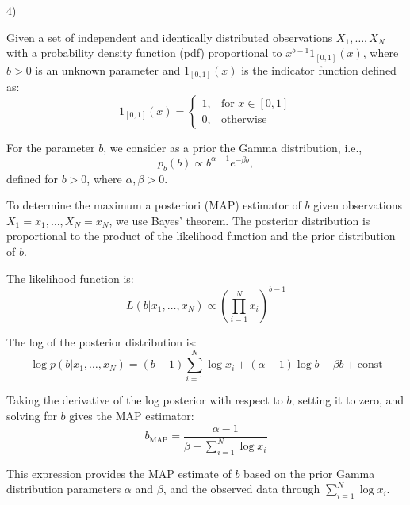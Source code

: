 \documentclass[12pt]{article}
\begin{document}
4)

Given a set of independent and identically distributed observations \(X_1, \ldots, X_N\) with a probability density function (pdf) proportional to \(x^{b-1}1_{[0,1]}(x)\), where \(b > 0\) is an unknown parameter and \(1_{[0,1]}(x)\) is the indicator function defined as:
\[
1_{[0,1]}(x) = 
\begin{cases} 
1, & \text{for } x \in [0, 1] \\
0, & \text{otherwise}
\end{cases}
\]

For the parameter \(b\), we consider as a prior the Gamma distribution, i.e.,
\[
p_b(b) \propto b^{\alpha-1}e^{-\beta b},
\]
defined for \(b > 0\), where \(\alpha, \beta > 0\).

To determine the maximum a posteriori (MAP) estimator of \(b\) given observations \(X_1 = x_1, \ldots, X_N = x_N\), we use Bayes' theorem. The posterior distribution is proportional to the product of the likelihood function and the prior distribution of \(b\). 

The likelihood function is:
\[
L(b|x_1, \ldots, x_N) \propto \left(\prod_{i=1}^{N}x_i\right)^{b-1}
\]

The log of the posterior distribution is:
\[
\log p(b|x_1, \ldots, x_N) = (b-1) \sum_{i=1}^{N} \log x_i + (\alpha-1)\log b - \beta b + \text{const}
\]

Taking the derivative of the log posterior with respect to \(b\), setting it to zero, and solving for \(b\) gives the MAP estimator:
\[
b_{\text{MAP}} = \frac{\alpha - 1}{\beta - \sum_{i=1}^{N} \log x_i}
\]

This expression provides the MAP estimate of \(b\) based on the prior Gamma distribution parameters \(\alpha\) and \(\beta\), and the observed data through \(\sum_{i=1}^{N} \log x_i\).
\end{document}
